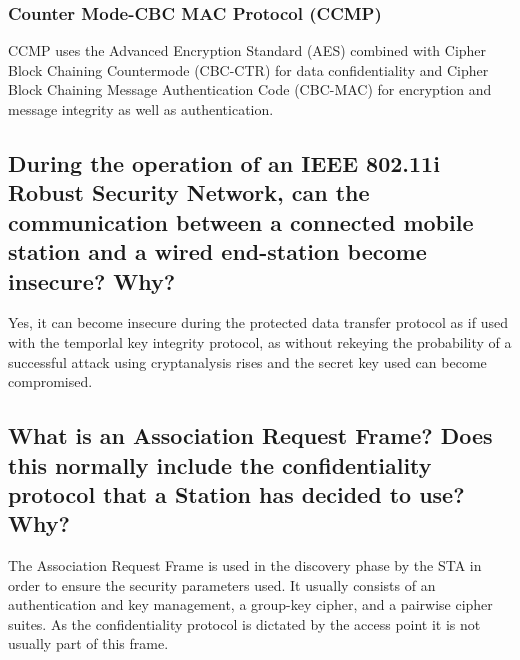 \documentclass{report}
\begin{document}
			\subsubsection{Counter Mode-CBC MAC Protocol (CCMP)}
			\startsubsection
				CCMP uses the Advanced Encryption Standard (AES) combined with Cipher Block Chaining Countermode (CBC-CTR) for data confidentiality and Cipher Block Chaining Message Authentication Code (CBC-MAC) for encryption and message integrity as well as authentication.
			\closesection
		\closesection
		
		\subsection{During the operation of an IEEE 802.11i Robust Security Network, can the communication between a connected mobile station and a wired end-station become insecure? Why?}
		\startsubsection
			Yes, it can become insecure during the protected data transfer protocol as if used with the temporlal key integrity protocol, as without rekeying the probability of a successful attack using cryptanalysis rises and the secret key used can become compromised.
		\closesection
		
		\subsection{What is an Association Request Frame? Does this normally include the confidentiality protocol that a Station has decided to use? Why?}
		\startsubsection
			The Association Request Frame is used in the discovery phase by the STA in order to ensure the security parameters used. It usually consists of an authentication and key management, a group-key cipher, and a pairwise cipher suites. As the confidentiality protocol is dictated by the access point it is not usually part of this frame.
		\closesection
	\closesection
\end{document}
